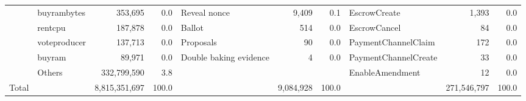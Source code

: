 \begin{table}[htbp]
\begin{tabular}{@{}lp{0.7in}rrp{1.2in}rrp{0.9in}rr@{}}
      & buyrambytes &                353,695  &                0.0  & Reveal nonce &            9,409  &         0.1  & EscrowCreate &                 1,393  &         0.0  \\
      & rentcpu &                187,878  &                0.0  & Ballot &                514  &         0.0  & EscrowCancel &                      84  &         0.0  \\
      & voteproducer &                137,713  &                0.0  & Proposals &                  90  &         0.0  & PaymentChannelClaim &                    172  &         0.0  \\
      & buyram &                  89,971  &                0.0  & Double baking evidence &                    4  &         0.0  & PaymentChannelCreate &                      33  &         0.0  \\
      & Others &        332,799,590  &                3.8  &   &   &   & EnableAmendment &                      12  &         0.0  \\
    \midrule
    \midrule
    Total &   &    8,815,351,697  &           100.0  &   &    9,084,928  &    100.0  &   &    271,546,797  &    100.0  \\
    \bottomrule
    \end{tabular}%
\end{table}
